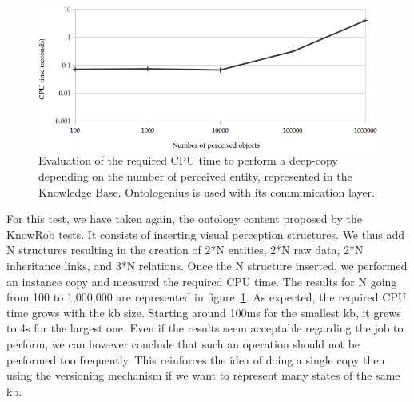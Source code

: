 \begin{figure}[ht!]
\centering
\includegraphics[width=\textwidth]{figures/chapter2/extra_tests/deepcopy.png}
\caption{\label{fig:chap2_extra_deepcopy} Evaluation of the required CPU time to perform a deep-copy depending on the number of perceived entity, represented in the Knowledge Base. Ontologenius is used with its communication layer. }
\end{figure}

For this test, we have taken again, the ontology content proposed by the KnowRob tests. It consists of inserting visual perception structures. We thus add N structures resulting in the creation of 2*N entities, 2*N raw data, 2*N inheritance links, and 3*N relations. Once the N structure inserted, we performed an instance copy and measured the required CPU time. The results for N going from 100 to 1,000,000 are represented in figure~\ref{fig:chap2_extra_deepcopy}. As expected, the required CPU time grows with the \acrshort{kb} size. Starting around 100ms for the smallest \acrshort{kb}, it grews to 4s for the largest one. Even if the results seem acceptable regarding the job to perform, we can however conclude that such an operation should not be performed too frequently. This reinforces the idea of doing a single copy then using the versioning mechanism if we want to represent many states of the same \acrshort{kb}.
